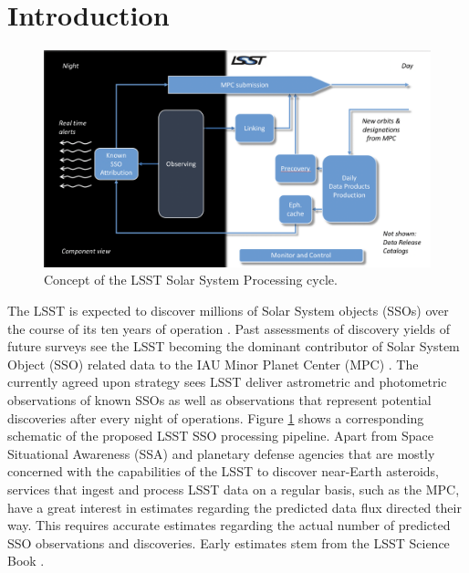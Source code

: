 \section{Introduction} \label{sec:intro}
\begin{figure}[tb!]
\begin{center}
\includegraphics[scale=0.27]{figs/mops2.png}
\end{center}
\caption{Concept of the LSST Solar System Processing cycle.}
\label{fig:mops}       %
\end{figure}
The LSST is expected to discover millions of Solar System objects (SSOs) over the course of its ten years of operation \citep{jones2015asteroid}. 
Past assessments of discovery yields of future surveys see the LSST becoming the dominant contributor of Solar System Object (SSO) related data to the IAU Minor Planet Center (MPC) \citep{LSSTscibook2009}. The currently agreed upon strategy sees LSST deliver astrometric and photometric observations of 
known SSOs as well as observations that represent potential discoveries after every night of operations.
Figure \ref{fig:mops} shows a corresponding schematic of the proposed LSST SSO processing pipeline. 
Apart from Space Situational Awareness (SSA) and planetary defense agencies that are mostly concerned with the capabilities of the LSST to discover near-Earth asteroids, services that ingest and process LSST data on a regular basis, such as the MPC, 
have a great interest in estimates regarding the predicted data flux directed their way. This requires accurate estimates regarding the actual number of predicted SSO observations and discoveries. Early estimates stem from the LSST Science Book \citep{LSSTscibook2009}. 
